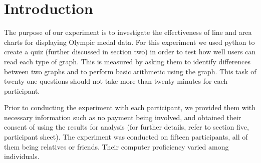 \section{Introduction}

\begin{flushleft}
    \quad The purpose of our experiment is to investigate the effectiveness of line and area charts for displaying Olympic medal data.
    For this experiment we used python to create a quiz (further discussed in section two) in order to test how well users can read
    each type of graph. This is measured by asking them to identify differences between two graphs and to perform basic arithmetic
    using the graph. This task of twenty one questions should not take more than twenty minutes for each participant.
    
    \quad Prior to conducting the experiment with each participant, we provided them with necessary information such as no payment being involved, and obtained their consent of using the results for analysis (for further details, refer to section five, participant sheet). The experiment was conducted on fifteen participants, all of them being relatives or friends. Their computer proficiency varied among individuals. 
\end{flushleft}


